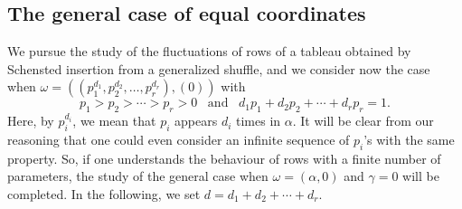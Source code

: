 \documentclass[smallextended,nospthms]{svjour3}
\theoremstyle{remark}
\begin{document}
\subsection{The general case of equal coordinates}
We pursue the study of the fluctuations of rows of a tableau obtained by Schensted insertion from a generalized shuffle, and we consider now the case when
$\omega=((p_{1}^{d_{1}},p_{2}^{d_{2}}, \ldots,p_{r}^{d_{r}}),(0))$ with 
$$p_{1}>p_{2}>\cdots>p_{r}>0 \,\,\,\text{ and }\,\,\,d_{1}p_{1}+d_{2}p_{2}+\cdots+d_{r}p_{r}=1.$$
Here, by $p_{i}^{d_{i}}$, we mean that $p_{i}$ appears $d_{i}$ times in $\alpha$. It will be clear from our reasoning that one could even consider an infinite sequence of $p_{i}$'s with the same property. So, if one understands the behaviour of rows with a finite number of parameters, the study of the general case when $\omega=(\alpha,0)$ and $\gamma=0$ will be completed. In the following, we set $d=d_{1}+d_{2}+\cdots+d_{r}$.\bigskip\bigskip
\end{document}
